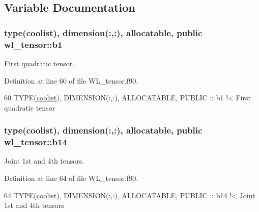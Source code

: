 \subsection{Variable Documentation}
\subsubsection[{\texorpdfstring{b1}{b1}}]{\setlength{\rightskip}{0pt plus 5cm}type({\bf coolist}), dimension(\+:,\+:), allocatable, public wl\+\_\+tensor\+::b1}\hypertarget{namespacewl__tensor_a6ffcc1305329bf3f57ab21e715172613}{}\label{namespacewl__tensor_a6ffcc1305329bf3f57ab21e715172613}


First quadratic tensor. 



Definition at line 60 of file W\+L\+\_\+tensor.\+f90.


\begin{DoxyCode}
60   \textcolor{keywordtype}{TYPE}(\hyperlink{structtensor_1_1coolist}{coolist}), \textcolor{keywordtype}{DIMENSION(:,:)}, \textcolor{keywordtype}{ALLOCATABLE}, \textcolor{keywordtype}{PUBLIC} :: b1\textcolor{comment}{    !< First quadratic tensor}
\end{DoxyCode}
\subsubsection[{\texorpdfstring{b14}{b14}}]{\setlength{\rightskip}{0pt plus 5cm}type({\bf coolist}), dimension(\+:,\+:), allocatable, public wl\+\_\+tensor\+::b14}\hypertarget{namespacewl__tensor_a61a16cdd059c4be04ecad332fe4b19f8}{}\label{namespacewl__tensor_a61a16cdd059c4be04ecad332fe4b19f8}


Joint 1st and 4th tensors. 



Definition at line 64 of file W\+L\+\_\+tensor.\+f90.


\begin{DoxyCode}
64   \textcolor{keywordtype}{TYPE}(\hyperlink{structtensor_1_1coolist}{coolist}), \textcolor{keywordtype}{DIMENSION(:,:)}, \textcolor{keywordtype}{ALLOCATABLE}, \textcolor{keywordtype}{PUBLIC} :: b14\textcolor{comment}{   !< Joint 1st and 4th tensors}
\end{DoxyCode}
